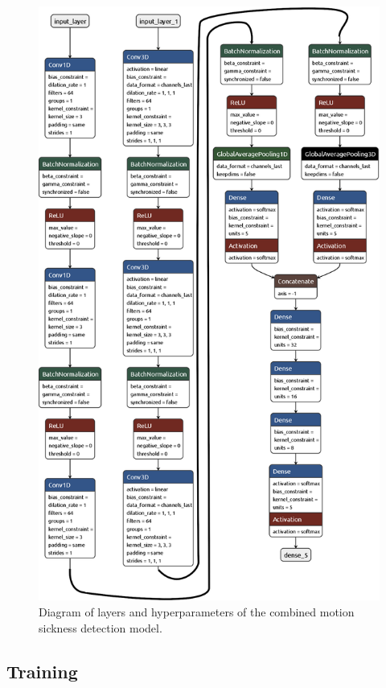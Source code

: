 \pagebreak
\begin{figure}[h!]
    \includegraphics[height=0.7\paperheight]{Figures/3_5_24_model_full.keras}
    \centering
    \caption{Diagram of layers and hyperparameters of the combined motion sickness detection model.}
    \label{fig:model diagram}
\end{figure}
\pagebreak

\subsection{Training}
\label{subsec:training}

